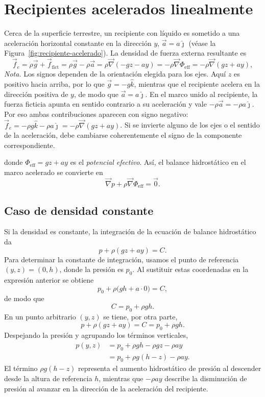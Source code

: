\section{Recipientes acelerados linealmente}

Cerca de la superficie terrestre, un recipiente con líquido es sometido a una aceleración horizontal constante en la dirección $y$, $\vec{a} = a\hat{\jmath}$ (véase la Figura~\ref{fig:recipiente-acelerado}). La densidad de fuerza externa resultante es
$$ \vec{f}_e = \rho\vec{g} + \vec{f}_{\mathrm{fict}} = \rho\vec{g} - \rho\vec{a} = \rho\vec{\nabla}(-gz - ay) = -\rho\vec{\nabla}\Phi_{\mathrm{eff}} = -\rho\vec{\nabla}(gz + ay), $$
\textit{Nota.} Los signos dependen de la orientación elegida para los ejes. Aquí $z$ es positivo hacia arriba, por lo que $\vec g=-g\hat{k}$, mientras que el recipiente acelera en la dirección positiva de $y$, de modo que $\vec a=a\hat{\jmath}$. En el marco unido al recipiente, la fuerza ficticia apunta en sentido contrario a su aceleración y vale $-\rho\vec a=-\rho a\hat{\jmath}$. Por eso ambas contribuciones aparecen con signo negativo: $\vec f_e=-\rho g\hat{k}-\rho a\hat{\jmath}=-\rho\vec\nabla(gz+ay)$. Si se invierte alguno de los ejes o el sentido de la aceleración, debe cambiarse coherentemente el signo de la componente correspondiente.

donde $\Phi_{\mathrm{eff}} = gz + ay$ es el \emph{potencial efectivo}. Así, el balance hidrostático en el marco acelerado se convierte en
$$ \vec{\nabla}p + \rho\vec{\nabla}\Phi_{\mathrm{eff}} = \vec{0}. $$

\figuraRecipienteAcelerado

\subsection{Caso de densidad constante}

Si la densidad es constante, la integración de la ecuación de balance hidrostático da
$$ p + \rho(gz + ay) = C. $$
Para determinar la constante de integración, usamos el punto de referencia $(y,z)=(0,h)$, donde la presión es $p_0$. Al sustituir estas coordenadas en la expresión anterior se obtiene
$$
p_0+\rho\bigl(gh+a\cdot0\bigr)=C,
$$
de modo que
$$
C=p_0+\rho gh.
$$
En un punto arbitrario $(y,z)$ se tiene, por otra parte,
$$
p+\rho(gz+ay)=C=p_0+\rho gh.
$$
Despejando la presión y agrupando los términos verticales,
$$
\begin{aligned}
p(y,z)
&=p_0+\rho gh-\rho gz-\rho ay\\
&=p_0+\rho g(h-z)-\rho ay.
\end{aligned}
$$
El término $\rho g(h-z)$ representa el aumento hidrostático de presión al descender desde la altura de referencia $h$, mientras que $-\rho ay$ describe la disminución de presión al avanzar en la dirección de la aceleración del recipiente.

